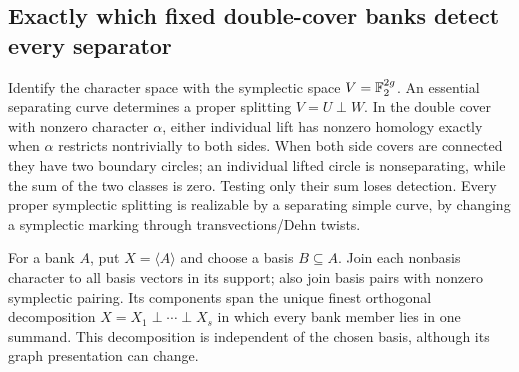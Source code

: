 \subsection{Exactly which fixed double-cover banks detect every separator}

Identify the character space with the symplectic space
$V=\mathbb{F}_2^{2g}$. An essential separating curve determines a proper splitting
$V=U\perp W$. In the double cover with nonzero character $\alpha$, either
individual lift has nonzero homology exactly when $\alpha$ restricts
nontrivially to both sides. When both side covers are connected they have
two boundary circles; an individual lifted circle is nonseparating, while
the sum of the two classes is zero. Testing only their sum loses detection.
Every proper symplectic splitting is realizable by a separating simple
curve, by changing a symplectic marking through transvections/Dehn twists.

For a bank $A$, put $X=\langle A\rangle$ and choose a basis $B\subseteq A$.
Join each nonbasis character to all basis vectors in its support; also join
basis pairs with nonzero symplectic pairing. Its components span the unique
finest orthogonal decomposition $X=X_1\perp\cdots\perp X_s$ in which every bank
member lies in one summand. This decomposition is independent of the chosen
basis, although its graph presentation can change.

